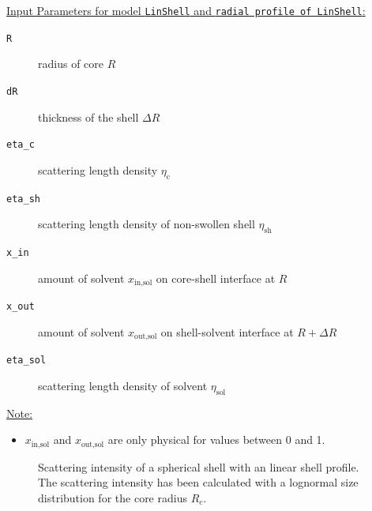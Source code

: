 \uline{Input Parameters for model \texttt{LinShell} and \texttt{radial profile of LinShell}:}\\
\begin{description}
\item[\texttt{R}] radius of core $R$
\item[\texttt{dR}] thickness of the shell $\Delta R$
\item[\texttt{eta\_c}] scattering length density $\eta_\text{c}$
\item[\texttt{eta\_sh}] scattering length density of non-swollen shell $\eta_\text{sh}$
\item[\texttt{x\_in}] amount of solvent $x_\text{in,sol}$ on core-shell interface at $R$
\item[\texttt{x\_out}] amount of solvent $x_\text{out,sol}$ on shell-solvent interface at $R+\Delta R$
\item[\texttt{eta\_sol}] scattering length density of solvent $\eta_\text{sol}$
\end{description}

\noindent\uline{Note:}
\begin{itemize}
\item $x_\text{in,sol}$ and $x_\text{out,sol}$ are only physical for values between 0 and 1.
\end{itemize}


\begin{figure}[htb]
\captionsetup[subfigure]{position=b}
\centering
{}
\hfill
{}
\caption{Scattering intensity of a spherical shell with an linear shell profile. The scattering intensity has been calculated
with a lognormal size distribution for the core radius $R_c$.}
\label{fig:I_LinShell}
\end{figure}

